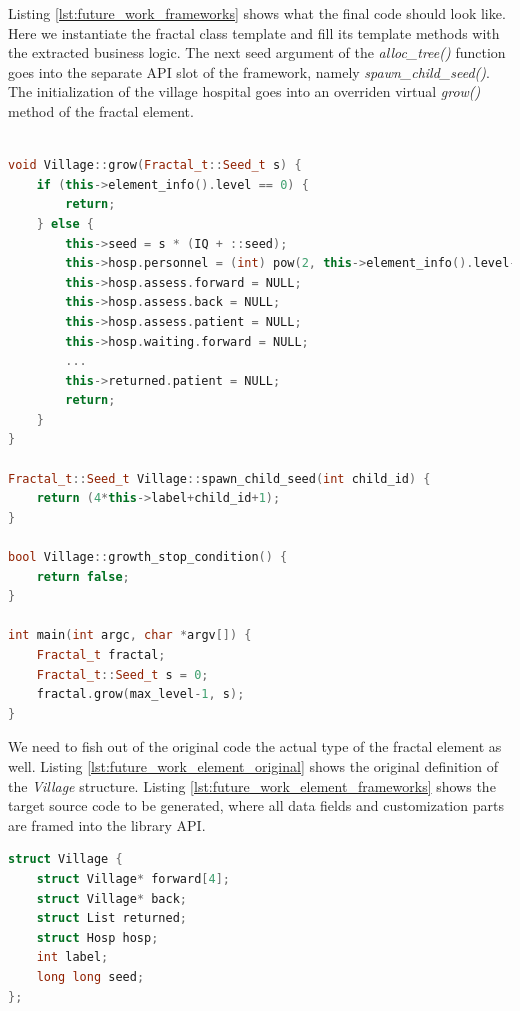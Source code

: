 \quad Listing \ref{lst:future_work_frameworks} shows what the final code should look like. Here we instantiate the fractal class template and fill its template methods with the extracted business logic. The next seed argument of the \textit{alloc\_tree()} function goes into the separate API slot of the framework, namely \textit{spawn\_child\_seed()}. The initialization of the village hospital goes into an overriden virtual \textit{grow()} method of the fractal element.

\begin{minipage}[t]{\linewidth}
\begin{lstlisting}[caption={Computational framework class template skeleton},label={lst:future_work_frameworks},language=C++]

void Village::grow(Fractal_t::Seed_t s) {
    if (this->element_info().level == 0) {
        return;
    } else {
        this->seed = s * (IQ + ::seed); 
        this->hosp.personnel = (int) pow(2, this->element_info().level-1);
        this->hosp.assess.forward = NULL;
        this->hosp.assess.back = NULL;
        this->hosp.assess.patient = NULL;
        this->hosp.waiting.forward = NULL;
        ...
        this->returned.patient = NULL;
        return;
    }
}

Fractal_t::Seed_t Village::spawn_child_seed(int child_id) {
    return (4*this->label+child_id+1);
}

bool Village::growth_stop_condition() {
    return false;
}

int main(int argc, char *argv[]) { 
    Fractal_t fractal;
    Fractal_t::Seed_t s = 0;
    fractal.grow(max_level-1, s);
}
\end{lstlisting}
\end{minipage}

\quad We need to fish out of the original code the actual type of the fractal element as well. Listing \ref{lst:future_work_element_original} shows the original definition of the \textit{Village} structure. Listing \ref{lst:future_work_element_frameworks} shows the target source code to be generated, where all data fields and customization parts are framed into the library API.

\begin{minipage}[t]{\linewidth}
\begin{lstlisting}[caption={Computational framework class template skeleton},label={lst:future_work_element_original},language=C]
struct Village {
    struct Village* forward[4];
    struct Village* back;
    struct List returned;
    struct Hosp hosp;   
    int label;
    long long seed;
};
\end{lstlisting}
\end{minipage}

